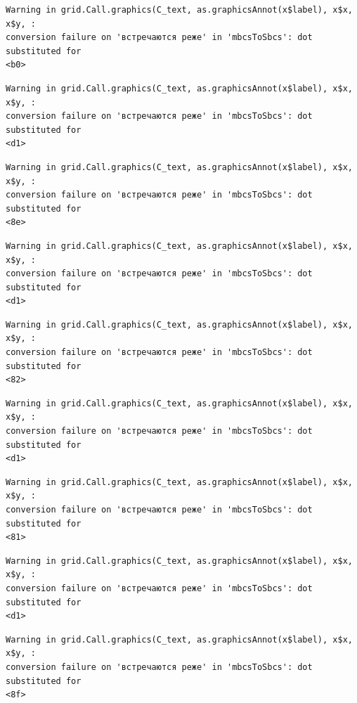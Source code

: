 \documentclass[
  letterpaper,
  DIV=11,
  numbers=noendperiod]{scrreprt}
\theoremstyle{definition}
\theoremstyle{remark}
\begin{document}
\begin{verbatim}
Warning in grid.Call.graphics(C_text, as.graphicsAnnot(x$label), x$x, x$y, :
conversion failure on 'встречаются реже' in 'mbcsToSbcs': dot substituted for
<b0>
\end{verbatim}

\begin{verbatim}
Warning in grid.Call.graphics(C_text, as.graphicsAnnot(x$label), x$x, x$y, :
conversion failure on 'встречаются реже' in 'mbcsToSbcs': dot substituted for
<d1>
\end{verbatim}

\begin{verbatim}
Warning in grid.Call.graphics(C_text, as.graphicsAnnot(x$label), x$x, x$y, :
conversion failure on 'встречаются реже' in 'mbcsToSbcs': dot substituted for
<8e>
\end{verbatim}

\begin{verbatim}
Warning in grid.Call.graphics(C_text, as.graphicsAnnot(x$label), x$x, x$y, :
conversion failure on 'встречаются реже' in 'mbcsToSbcs': dot substituted for
<d1>
\end{verbatim}

\begin{verbatim}
Warning in grid.Call.graphics(C_text, as.graphicsAnnot(x$label), x$x, x$y, :
conversion failure on 'встречаются реже' in 'mbcsToSbcs': dot substituted for
<82>
\end{verbatim}

\begin{verbatim}
Warning in grid.Call.graphics(C_text, as.graphicsAnnot(x$label), x$x, x$y, :
conversion failure on 'встречаются реже' in 'mbcsToSbcs': dot substituted for
<d1>
\end{verbatim}

\begin{verbatim}
Warning in grid.Call.graphics(C_text, as.graphicsAnnot(x$label), x$x, x$y, :
conversion failure on 'встречаются реже' in 'mbcsToSbcs': dot substituted for
<81>
\end{verbatim}

\begin{verbatim}
Warning in grid.Call.graphics(C_text, as.graphicsAnnot(x$label), x$x, x$y, :
conversion failure on 'встречаются реже' in 'mbcsToSbcs': dot substituted for
<d1>
\end{verbatim}

\begin{verbatim}
Warning in grid.Call.graphics(C_text, as.graphicsAnnot(x$label), x$x, x$y, :
conversion failure on 'встречаются реже' in 'mbcsToSbcs': dot substituted for
<8f>
\end{verbatim}
\end{document}
